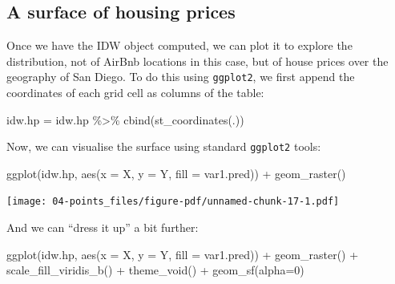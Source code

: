 \documentclass[
  letterpaper,
  DIV=11,
  numbers=noendperiod,
  oneside]{scrreprt}
\newenvironment{Shaded}{\begin{snugshade}}{\end{snugshade}}
\newcommand{\AttributeTok}[1]{\textcolor[rgb]{0.40,0.45,0.13}{#1}}
\newcommand{\DecValTok}[1]{\textcolor[rgb]{0.68,0.00,0.00}{#1}}
\newcommand{\FunctionTok}[1]{\textcolor[rgb]{0.28,0.35,0.67}{#1}}
\newcommand{\NormalTok}[1]{\textcolor[rgb]{0.00,0.23,0.31}{#1}}
\newcommand{\OtherTok}[1]{\textcolor[rgb]{0.00,0.23,0.31}{#1}}
\newcommand{\SpecialCharTok}[1]{\textcolor[rgb]{0.37,0.37,0.37}{#1}}
\begin{document}
\subsection{A surface of housing
prices}\label{a-surface-of-housing-prices}

Once we have the IDW object computed, we can plot it to explore the
distribution, not of AirBnb locations in this case, but of house prices
over the geography of San Diego. To do this using \texttt{ggplot2}, we
first append the coordinates of each grid cell as columns of the table:

\begin{Shaded}
\begin{Highlighting}[]
\NormalTok{idw.hp }\OtherTok{=}\NormalTok{ idw.hp }\SpecialCharTok{\%\textgreater{}\%}
  \FunctionTok{cbind}\NormalTok{(}\FunctionTok{st\_coordinates}\NormalTok{(.))}
\end{Highlighting}
\end{Shaded}

Now, we can visualise the surface using standard \texttt{ggplot2} tools:

\begin{Shaded}
\begin{Highlighting}[]
\FunctionTok{ggplot}\NormalTok{(idw.hp, }\FunctionTok{aes}\NormalTok{(}\AttributeTok{x =}\NormalTok{ X, }\AttributeTok{y =}\NormalTok{ Y, }\AttributeTok{fill =}\NormalTok{ var1.pred)) }\SpecialCharTok{+}
  \FunctionTok{geom\_raster}\NormalTok{()}
\end{Highlighting}
\end{Shaded}

\texttt{[image: 04-points\_files/figure-pdf/unnamed-chunk-17-1.pdf]}

And we can ``dress it up'' a bit further:

\begin{Shaded}
\begin{Highlighting}[]
\FunctionTok{ggplot}\NormalTok{(idw.hp, }\FunctionTok{aes}\NormalTok{(}\AttributeTok{x =}\NormalTok{ X, }\AttributeTok{y =}\NormalTok{ Y, }\AttributeTok{fill =}\NormalTok{ var1.pred)) }\SpecialCharTok{+}
  \FunctionTok{geom\_raster}\NormalTok{() }\SpecialCharTok{+}
  \FunctionTok{scale\_fill\_viridis\_b}\NormalTok{() }\SpecialCharTok{+}
  \FunctionTok{theme\_void}\NormalTok{() }\SpecialCharTok{+}
  \FunctionTok{geom\_sf}\NormalTok{(}\AttributeTok{alpha=}\DecValTok{0}\NormalTok{)}
\end{Highlighting}
\end{Shaded}
\end{document}
